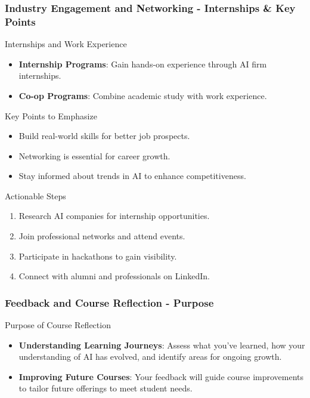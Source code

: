 \documentclass{beamer}
\begin{document}
\begin{frame}[fragile]
    \frametitle{Industry Engagement and Networking - Internships & Key Points}
    \begin{block}{Internships and Work Experience}
        \begin{itemize}
            \item \textbf{Internship Programs}: Gain hands-on experience through AI firm internships.
            \item \textbf{Co-op Programs}: Combine academic study with work experience.
        \end{itemize}
    \end{block}
    
    \begin{block}{Key Points to Emphasize}
        \begin{itemize}
            \item Build real-world skills for better job prospects.
            \item Networking is essential for career growth.
            \item Stay informed about trends in AI to enhance competitiveness.
        \end{itemize}
    \end{block}
    
    \begin{block}{Actionable Steps}
        \begin{enumerate}
            \item Research AI companies for internship opportunities.
            \item Join professional networks and attend events.
            \item Participate in hackathons to gain visibility.
            \item Connect with alumni and professionals on LinkedIn.
        \end{enumerate}
    \end{block}
\end{frame}

\begin{frame}[fragile]
    \frametitle{Feedback and Course Reflection - Purpose}
    \begin{block}{Purpose of Course Reflection}
        \begin{itemize}
            \item \textbf{Understanding Learning Journeys}: Assess what you've learned, how your understanding of AI has evolved, and identify areas for ongoing growth.
            \item \textbf{Improving Future Courses}: Your feedback will guide course improvements to tailor future offerings to meet student needs.
        \end{itemize}
    \end{block}
\end{frame}
\end{document}
